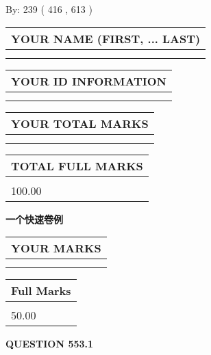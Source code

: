 \documentclass{ctexart}
\begin{document}
   
\hspace{1.0in} By: 
 239 ( 416 ,  613 )
   
   
   
   
\newpage 
\setcounter{page}{ 
   553001 } 
   
   
   
   
\noindent\begin{tabular}{|l|}
\hline
YOUR NAME (FIRST, ... LAST)  \\
\hline
 \\ 
 \\ 
\hline
\end{tabular}
\hspace{0.05in} \begin{tabular}{|l|}
\hline
 YOUR   ID   INFORMATION  \\
\hline
 \\ 
 \\ 
\hline
\end{tabular}
   
   
\vspace{0.2in}\noindent\begin{tabular}{|l|}
\hline
YOUR TOTAL MARKS  \\
\hline
 \\ 
 \\ 
\hline
\end{tabular}
\hspace{0.05in} \begin{tabular}{|l|}
\hline
TOTAL FULL MARKS  \\
\hline
 \\ 
100.00 \\
\hline
\end{tabular}
   
   
 \vspace{0.2in}
{\LARGE {\textbf{ 一个快速卷例}}}
   
   
  
\vspace{0.2in}
  
\noindent\begin{tabular}{|l|}
\hline
 YOUR MARKS  \\
\hline
 \\ 
 \\ 
\hline
\end{tabular}
\hspace{0.05in} \begin{tabular}{|l|}
\hline
 Full Marks  \\
\hline
 \\ 
50.00 \\
\hline
\end{tabular}
{\textbf{\Large{QUESTION
553.1 
}}}
  
\end{document}
